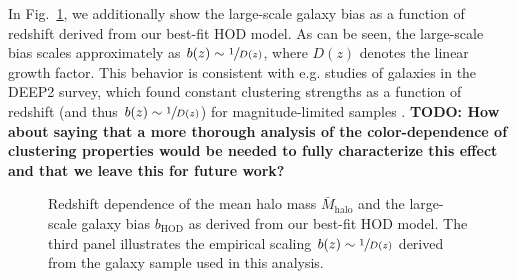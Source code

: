 \documentclass[a4paper,11pt]{article}
\newcommand{\todo}[1]{{\bf TODO: #1}}
\begin{document}
In Fig.~\ref{fig:HOD-redshift}, we additionally show the large-scale galaxy bias as a function of redshift derived from our best-fit HOD model. As can be seen, the large-scale bias scales approximately as $b(z) \sim \sfrac{1}{D(z)}$, where $D(z)$ denotes the linear growth factor. This behavior is consistent with e.g. studies of galaxies in the DEEP2 survey, which found constant clustering strengths as a function of redshift (and thus $b(z) \sim \sfrac{1}{D(z)}$) for magnitude-limited samples \cite{Coil:2004}. \todo{How about saying that a more thorough analysis of the color-dependence of clustering properties would be needed to fully characterize this effect and that we leave this for future work?}

\begin{figure}
\begin{center}
\caption{Redshift dependence of the mean halo mass $\bar{M}_{\mathrm{halo}}$ and the large-scale galaxy bias $b_{\mathrm{HOD}}$ as derived from our best-fit HOD model. The third panel illustrates the empirical scaling $b(z) \sim \sfrac{1}{D(z)}$ derived from the galaxy sample used in this analysis.}
\label{fig:HOD-redshift}
\end{center}
\end{figure}
\end{document}
